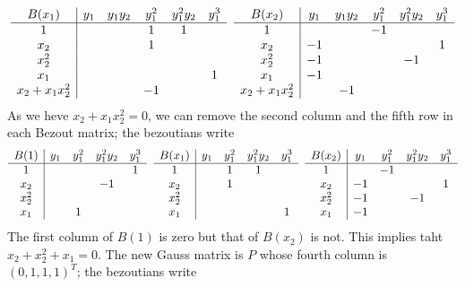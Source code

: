 \documentclass{standalone}
\begin{document}
$$
\begin{array}{c|ccccc}
	B(x_1)  & y_1 & y_1y_2 & y_1^2 & y_1^2y_2 & y_1^3 \\
	\hline
	1  &  &  & 1 & 1 & \\
	x_2  &  &  & 1 &  & \\
	x_2^2  &  &  &  &  & \\
	x_1  &  &  &  &  & 1 \\
	x_2 + x_1x_2^2  &  &  & -1 &  &
\end{array}
\hspace{0.2cm}
\begin{array}{c|ccccc}
	B(x_2) & y_1 & y_1y_2 & y_1^2 & y_1^2y_2 & y_1^3 \\
	\hline
	1  &  &  & -1 &  & \\
	x_2  & -1 &  &  &  & 1 \\
	x_2^2  & -1 &  &  & -1 & \\
	x_1  & -1 &  &  &  & \\
	x_2 + x_1x_2^2 &  & -1 &  &  &
\end{array}
$$
As we heve $x_2 + x_1x_2^{2} = 0$, we can remove the second column and the fifth row in each Bezout matrix; the bezoutians write
$$
\begin{array}{c|cccc}
	B(1) & y_1 & y_1^2 & y_1^2y_2 & y_1^3 \\
	\hline
	1  &   &  &  & 1 \\
	x_2  &  &  & -1 & \\
	x_2^2  &  &  &  & \\
	x_1  &  & 1 &  &
\end{array}
\hspace{0.2cm}
\begin{array}{c|cccc}
	B(x_1)  & y_1 & y_1^2 & y_1^2y_2 & y_1^3 \\
	\hline
	1  &  & 1 & 1 & \\
	x_2  &  & 1 &  & \\
	x_2^2  &  &  &  & \\
	x_1  &  &  &  & 1
\end{array}
\hspace{0.2cm}
\begin{array}{c|cccc}
	B(x_2) & y_1 & y_1^2 & y_1^2y_2 & y_1^3 \\
	\hline
	1  &  & -1 &  & \\
	x_2  & -1 &  &  & 1 \\
	x_2^2  & -1 &  & -1 & \\
	x_1  & -1 &  &  &
\end{array}
$$
The first column of $B(1)$ is zero but that of $B(x_2)$ is not. This implies taht $x_2 + x_2^{2} + x_1 = 0$. The new Gauss matrix is $P$ whose fourth column is $(0, 1, 1, 1)^{T}$; the bezoutians write
\end{document}
